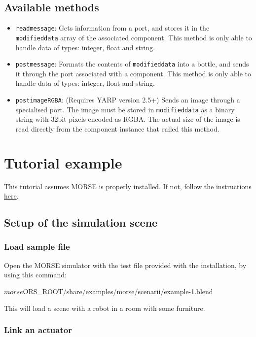 \documentclass[twoside,a4paper,10pt]{report}
\newcommand{\dokutitlelevelone}[1]{\chapter{#1}}
\newcommand{\dokutitleleveltwo}[1]{\section{#1}}
\newcommand{\dokutitleleveltree}[1]{\subsection{#1}}
\newcommand{\dokumonospace}[1]{\texttt{#1}}
\newcommand{\dokuitem}{\item}
\begin{document}
\dokutitleleveltwo{Available methods}
\label{a2d06dcb42bbd0519b19166fd7f36cea}%

\begin{itemize}
\dokuitem  \dokumonospace{read{\textunderscore}message}: Gets information from a port, and stores it in the \dokumonospace{modified{\textunderscore}data} array of the associated component. This method is only able to handle data of types: integer, float and string.
\dokuitem  \dokumonospace{post{\textunderscore}message}: Formats the contents of \dokumonospace{modified{\textunderscore}data} into a bottle, and sends it through the port associated with a component. This method is only able to handle data of types: integer, float and string.
\dokuitem  \dokumonospace{post{\textunderscore}image{\textunderscore}RGBA}: (Requires YARP version 2.5+) Sends an image through a specialised port. The image must be stored in \dokumonospace{modified{\textunderscore}data} as a binary string with 32bit pixels encoded as RGBA. The actual size of the image is read directly from the component instance that called this method.
\end{itemize}

\dokutitlelevelone{Tutorial example}
\label{d0e1bed8b40ec8e4f9cc0cc0a11ff110}%
\label{0575c8d592fb7b088226750aceec2b4e}%

This tutorial assumes MORSE is properly installed. If not, follow the instructions \hyperref[ea09bb364ef1bffd889e76b7a59035fc]{ here}.


\dokutitleleveltwo{Setup of the simulation scene}
\label{80527725485ea9e7bedbc9d918895a02}%

\dokutitleleveltree{Load sample file}
\label{4238ab1e3d8f80f2fdec7f34e17e0f67}%

Open the MORSE simulator with the test file provided with the installation, by using this command:



\small
\begin{verbatimtab}
$ morse $ORS_ROOT/share/examples/morse/scenarii/example-1.blend
\end{verbatimtab}
\normalsize

This will load a scene with a robot in a room with some furniture.


\dokutitleleveltree{Link an actuator}
\label{81c6b973417d3e5000d27d9c1c805b96}%
\end{document}
